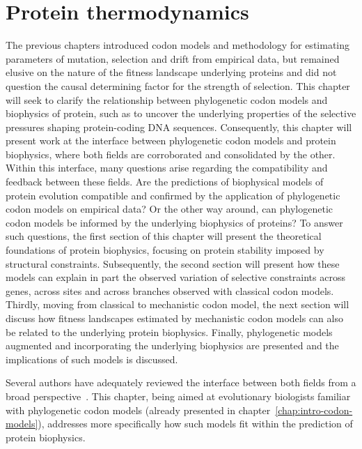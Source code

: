 \chapter{Protein thermodynamics}
{\hypersetup{linkcolor=GREYDARK}\minitoc}
\label{chap:intro-physic-proteins}

The previous chapters introduced \gls{codon} models and methodology for estimating parameters of mutation, selection and drift from empirical data, but remained elusive on the nature of the fitness landscape underlying proteins and did not question the causal determining factor for the strength of selection.
This chapter will seek to clarify the relationship between phylogenetic \gls{codon} models and biophysics of protein, such as to uncover the underlying properties of the selective pressures shaping protein-coding \acrshort{DNA} sequences.
Consequently, this chapter will present work at the interface between phylogenetic \gls{codon} models and protein biophysics, where both fields are corroborated and consolidated by the other.
Within this interface, many questions arise regarding the compatibility and feedback between these fields.
Are the predictions of biophysical models of protein evolution compatible and confirmed by the application of phylogenetic \gls{codon} models on empirical data?
Or the other way around, can phylogenetic \gls{codon} models be informed by the underlying biophysics of proteins?
To answer such questions, the first section of this chapter will present the theoretical foundations of protein biophysics, focusing on protein stability imposed by structural constraints.
Subsequently, the second section will present how these models can explain in part the observed variation of selective constraints across genes, across sites and across branches observed with classical \gls{codon} models.
Thirdly, moving from classical to mechanistic \gls{codon} model, the next section will discuss how fitness landscapes estimated by mechanistic \gls{codon} models can also be related to the underlying protein biophysics.
Finally, phylogenetic models augmented and incorporating the underlying biophysics are presented and the implications of such models is discussed.

Several authors have adequately reviewed the interface between both fields from a broad perspective~\citep{Liberles2012,Serohijos2014,Sikosek2014,Arenas2015,Echave2017,Bastolla2017}. This chapter, being aimed at evolutionary biologists familiar with phylogenetic \gls{codon} models (already presented in chapter~\ref{chap:intro-codon-models}), addresses more specifically how such models fit within the prediction of protein biophysics.

